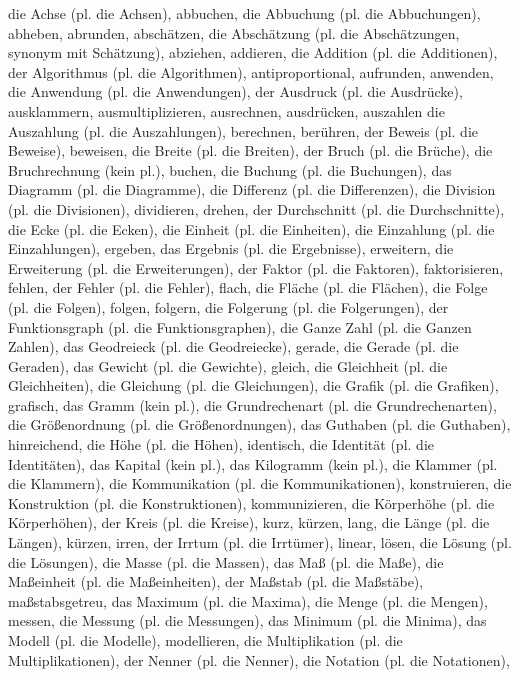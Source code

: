 die Achse (pl. die Achsen),
abbuchen,
die Abbuchung (pl. die Abbuchungen),
abheben,
abrunden,
abschätzen,
die Abschätzung (pl. die Abschätzungen, synonym mit Schätzung),
abziehen,
addieren,
die Addition (pl. die Additionen),
der Algorithmus (pl. die Algorithmen),
antiproportional,
aufrunden,
anwenden,
die Anwendung (pl. die Anwendungen),
der Ausdruck (pl. die Ausdrücke),
ausklammern,
ausmultiplizieren,
ausrechnen,
ausdrücken,
auszahlen
die Auszahlung (pl. die Auszahlungen),
berechnen,
berühren,
der Beweis (pl. die Beweise),
beweisen,
die Breite (pl. die Breiten),
der Bruch (pl. die Brüche),
die Bruchrechnung (kein pl.),
buchen,
die Buchung (pl. die Buchungen),
das Diagramm (pl. die Diagramme),
die Differenz (pl. die Differenzen),
die Division (pl. die Divisionen),
dividieren,
drehen,
der Durchschnitt (pl. die Durchschnitte),
die Ecke (pl. die Ecken),
die Einheit (pl. die Einheiten),
die Einzahlung (pl. die Einzahlungen),
ergeben,
das Ergebnis (pl. die Ergebnisse),
erweitern,
die Erweiterung (pl. die Erweiterungen),
der Faktor (pl. die Faktoren),
faktorisieren,
fehlen,
der Fehler (pl. die Fehler),
flach,
die Fläche (pl. die Flächen),
die Folge (pl. die Folgen),
folgen,
folgern,
die Folgerung (pl. die Folgerungen),
der Funktionsgraph (pl. die Funktionsgraphen),
die Ganze Zahl (pl. die Ganzen Zahlen),
das Geodreieck (pl. die Geodreiecke),
gerade,
die Gerade (pl. die Geraden),
das Gewicht (pl. die Gewichte),
gleich,
die Gleichheit (pl. die Gleichheiten),
die Gleichung (pl. die Gleichungen),
die Grafik (pl. die Grafiken),
grafisch,
das Gramm (kein pl.),
die Grundrechenart (pl. die Grundrechenarten),
die Größenordnung (pl. die Größenordnungen),
das Guthaben (pl. die Guthaben),
hinreichend,
die Höhe (pl. die Höhen),
identisch,
die Identität (pl. die Identitäten),
das Kapital (kein pl.),
das Kilogramm (kein pl.),
die Klammer (pl. die Klammern),
die Kommunikation (pl. die Kommunikationen),
konstruieren,
die Konstruktion (pl. die Konstruktionen),
kommunizieren,
die Körperhöhe (pl. die Körperhöhen),
der Kreis (pl. die Kreise),
kurz,
kürzen,
lang,
die Länge (pl. die Längen),
kürzen,
irren,
der Irrtum (pl. die Irrtümer),
linear,
lösen,
die Lösung (pl. die Lösungen),
die Masse (pl. die Massen),
das Maß (pl. die Maße),
die Maßeinheit (pl. die Maßeinheiten),
der Maßstab (pl. die Maßstäbe),
maßstabsgetreu,
das Maximum (pl. die Maxima),
die Menge (pl. die Mengen),
messen,
die Messung (pl. die Messungen),
das Minimum (pl. die Minima),
das Modell (pl. die Modelle),
modellieren,
die Multiplikation (pl. die Multiplikationen),
der Nenner (pl. die Nenner),
die Notation (pl. die Notationen),
